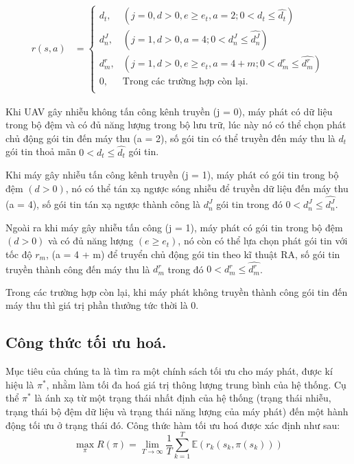 \documentclass{uetgraduation}
\begin{document}
\begin{align*}
    r(s,a) &= \begin{cases}
        d_t, & (j = 0, d > 0, e \geq e_t, a = 2; 0 < d_t \leq \hat{d_t}) \\
        d_n^J, & (j = 1, d > 0, a = 4; 0 < d_n^J \leq \hat{d_n^J}) \\
        d_m^r, & (j = 1, d > 0, e \geq e_t, a = 4 + m; 0 < d_m^r \leq \hat{d_m^r}) \\
        0, & \text{Trong các trường hợp còn lại.} \\
    \end{cases}
\end{align*}

Khi UAV gây nhiễu không tấn công kênh truyền (j = 0), máy phát có dữ liệu trong bộ đệm và có đủ năng lượng trong bộ lưu trữ, lúc này nó có thể chọn phát
chủ động gói tin đến máy thu (a = 2), số gói tin có thể truyền đến máy thu là $d_t$ gói tin thoả mãn $0 < d_t \leq \hat{d_t}$ gói tin.

Khi máy gây nhiễu tấn công kênh truyền (j = 1), máy phát có gói tin trong bộ đệm $(d > 0)$, nó có thể tán xạ ngược sóng nhiễu để truyền dữ liệu đến máy thu (a = 4), 
số gói tin tán xạ ngược thành công là $d_n^J$ gói tin trong đó $0 < d_n^J \leq \hat{d_n^J}$.

Ngoài ra khi máy gây nhiễu tấn công (j = 1), máy phát có gói tin trong bộ đệm $(d > 0)$ và có đủ năng lượng $(e \geq e_t)$, nó còn có thể lựa chọn phát gói 
tin với tốc độ $r_m$, (a = 4 + m) để truyển chủ động gói tin theo kĩ thuật RA, số gói tin truyền thành công đến máy thu là $d_m^r$ trong đó $0 < d_m^r \leq \hat{d_m^r}$.

Trong các trường hợp còn lại, khi máy phát không truyền thành công gói tin đến máy thu thì giá trị phần thưởng tức thời là 0.


\subsection{Công thức tối ưu hoá.}
Mục tiêu của chúng ta là tìm ra một chính sách tối ưu cho máy phát, được kí hiệu là $\pi^*$, nhằm làm tối đa hoá giá trị thông lượng trung bình
của hệ thống. Cụ thể $\pi^*$ là ánh xạ từ một trạng thái nhất định của hệ thống (trạng thái nhiễu, trạng thái bộ đệm dữ liệu và trạng thái năng
lượng của máy phát) đến một hành động tối ưu ở trạng thái đó.
Công thức hàm tối ưu hoá được xác định như sau:
\[
\max_{\pi} R(\pi) = \lim_{T \to \infty} \frac{1}{T} \sum_{k=1}^{T} \mathbb{E}\left( r_k(s_k, \pi(s_k)) \right)
\]
\end{document}
